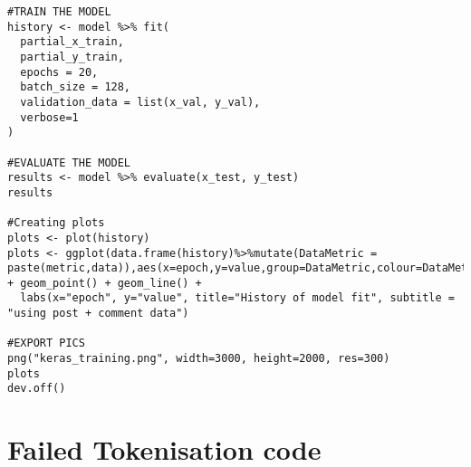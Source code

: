 \begin{lstlisting}
#TRAIN THE MODEL
history <- model %>% fit(
  partial_x_train,
  partial_y_train,
  epochs = 20,
  batch_size = 128,
  validation_data = list(x_val, y_val),
  verbose=1
)

#EVALUATE THE MODEL
results <- model %>% evaluate(x_test, y_test)
results

#Creating plots
plots <- plot(history)
plots <- ggplot(data.frame(history)%>%mutate(DataMetric = paste(metric,data)),aes(x=epoch,y=value,group=DataMetric,colour=DataMetric)) + geom_point() + geom_line() +
  labs(x="epoch", y="value", title="History of model fit", subtitle = "using post + comment data")

#EXPORT PICS
png("keras_training.png", width=3000, height=2000, res=300)
plots
dev.off()
\end{lstlisting}

\section{Failed Tokenisation code}
\label{sec:appendixFailedCode}
